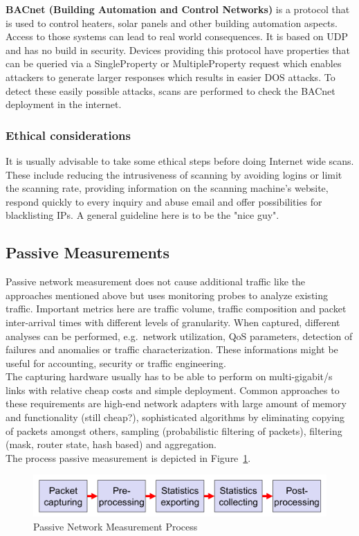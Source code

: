 \textbf{BACnet (Building Automation and Control Networks)} is a protocol that is used to control heaters, solar panels and other building automation aspects.
Access to those systems can lead to real world consequences.
It is based on UDP and has no build in security.
Devices providing this protocol have properties that can be queried via a SingleProperty or MultipleProperty request which enables attackers to generate larger responses which results in easier DOS attacks.
To detect these easily possible attacks, scans are performed to check the BACnet deployment in the internet.

\subsubsection*{Ethical considerations}
It is usually advisable to take some ethical steps before doing Internet wide scans.
These include reducing the intrusiveness of scanning by avoiding logins or limit the scanning rate, providing information on the scanning machine's website, respond quickly to every inquiry and abuse email and offer possibilities for blacklisting IPs.
A general guideline here is to be the "nice guy".

\subsection{Passive Measurements}
Passive network measurement does not cause additional traffic like the approaches mentioned above but uses monitoring probes to analyze existing traffic.
Important metrics here are traffic volume, traffic composition and packet inter-arrival times with different levels of granularity.
When captured, different analyses can be performed, e.g.\ network utilization, QoS parameters, detection of failures and anomalies or traffic characterization.
These informations might be useful for accounting, security or traffic engineering.\\

The capturing hardware usually has to be able to perform on multi-gigabit/s links with relative cheap costs and simple deployment.
Common approaches to these requirements are high-end network adapters with large amount of memory and functionality (still cheap?), sophisticated algorithms by eliminating copying of packets amongst others, sampling (probabilistic filtering of packets), filtering (mask, router state, hash based) and aggregation.\\

The process passive measurement is depicted in Figure~\ref{fig:passive_network_measurement}.
\begin{figure}[h]
  \centering
  \includegraphics[width=.8\textwidth]{figures/passive_network_measurement.png}
  \caption{Passive Network Measurement Process}\label{fig:passive_network_measurement}
\end{figure}

